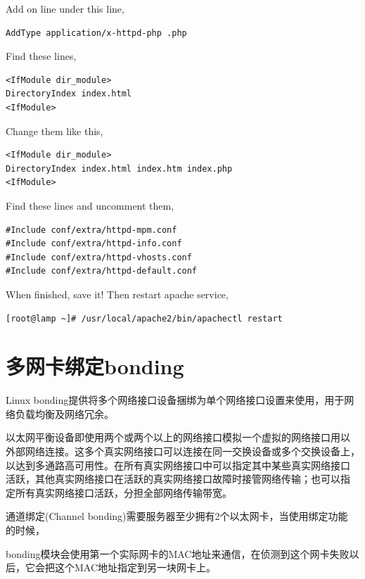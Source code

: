 Add on line under this line,

\small{
\begin{verbatim}
AddType application/x-httpd-php .php
\end{verbatim}
}
\normalsize

Find these lines,

\small{
\begin{verbatim}
<IfModule dir_module>
DirectoryIndex index.html
<IfModule>
\end{verbatim}
}
\normalsize

Change them like this,

\small{
\begin{verbatim}
<IfModule dir_module>
DirectoryIndex index.html index.htm index.php
<IfModule>
\end{verbatim}
}
\normalsize

Find these lines and uncomment them,

\small{
\begin{verbatim}
#Include conf/extra/httpd-mpm.conf
#Include conf/extra/httpd-info.conf
#Include conf/extra/httpd-vhosts.conf
#Include conf/extra/httpd-default.conf
\end{verbatim}
}
\normalsize

When finished, save it! Then restart apache service,

\small{
\begin{verbatim}
[root@lamp ~]# /usr/local/apache2/bin/apachectl restart
\end{verbatim}
}
\normalsize

\chapter{多网卡绑定bonding}

Linux bonding提供将多个网络接口设备捆绑为单个网络接口设置来使用，用于网
络负载均衡及网络冗余。

以太网平衡设备即使用两个或两个以上的网络接口模拟一个虚拟的网络接口用以
外部网络连接。这多个真实网络接口可以连接在同一交换设备或多个交换设备上，
以达到多通路高可用性。在所有真实网络接口中可以指定其中某些真实网络接口
活跃，其他真实网络接口在活跃的真实网络接口故障时接管网络传输；也可以指
定所有真实网络接口活跃，分担全部网络传输带宽。
 
通道绑定(Channel bonding)需要服务器至少拥有2个以太网卡，当使用绑定功能
的时候，
 
bonding模块会使用第一个实际网卡的MAC地址来通信，在侦测到这个网卡失败以
后，它会把这个MAC地址指定到另一块网卡上。

